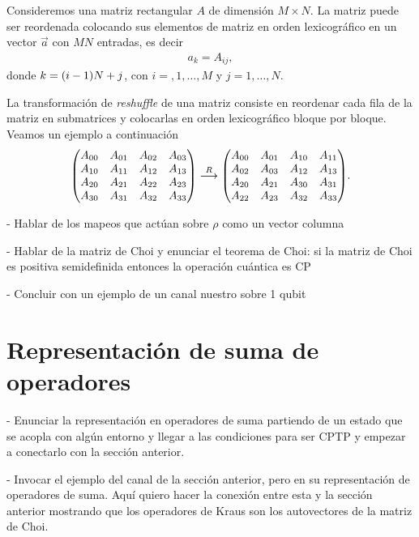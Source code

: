 Consideremos una matriz rectangular $A$ de dimensión $M\times N$.
La matriz puede ser reordenada colocando sus elementos de matriz en 
orden lexicográfico en un vector $\vec{a}$ con $MN$ entradas, es decir
\begin{align}
a_k=A_{ij}, 
\end{align}
donde $k=\qty(i-1)N+j$, con $i=,1,\ldots,M$ y $j=1,\ldots,N$.

La transformación de \textit{reshuffle} de una matriz consiste 
en reordenar cada fila de la matriz en submatrices y colocarlas en 
orden lexicográfico bloque por bloque. Veamos un ejemplo a continuación
\begin{align}
\mqty(
A_{00}&A_{01}&A_{02}&A_{03}\\
A_{10}&A_{11}&A_{12}&A_{13}\\
A_{20}&A_{21}&A_{22}&A_{23}\\
A_{30}&A_{31}&A_{32}&A_{33})
\stackrel{R}{\longrightarrow}
\mqty(
A_{00}&A_{01}&A_{10}&A_{11}\\
A_{02}&A_{03}&A_{12}&A_{13}\\
A_{20}&A_{21}&A_{30}&A_{31}\\
A_{22}&A_{23}&A_{32}&A_{33}).
\end{align}

- Hablar de los mapeos que actúan sobre $\rho$ como un vector columna 

- Hablar de la matriz de Choi y enunciar el teorema de Choi: si la matriz
 de Choi es positiva semidefinida entonces la operación cuántica es CP
 
- Concluir con un ejemplo de un canal nuestro sobre 1 qubit

\section{Representación de suma de operadores}
- Enunciar la representación en operadores de suma partiendo de un 
estado que se acopla con algún entorno
y llegar a las condiciones para ser CPTP y empezar a conectarlo
con la sección anterior. 

- Invocar el ejemplo del canal de la sección anterior, pero en su 
representación de operadores de suma. Aquí quiero hacer la conexión 
entre esta y la sección anterior mostrando que los operadores 
de Kraus son los autovectores de la matriz de Choi. 

